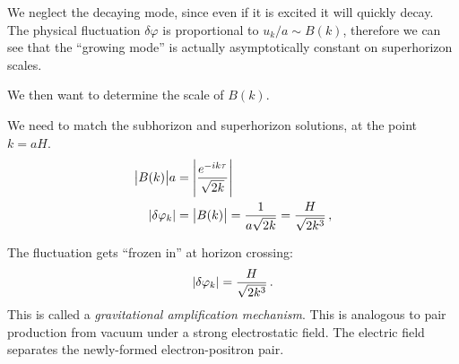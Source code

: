 \documentclass[main.tex]{subfiles}
\begin{document}
We neglect the decaying mode, since even if it is excited it will quickly decay.
The physical fluctuation \(\delta \varphi \) is proportional to \(u_k /a \sim B(k)\), therefore we can see that the ``growing mode'' is actually asymptotically constant on superhorizon scales. 

We then want to determine the scale of \(B(k)\). 

We need to match the subhorizon and superhorizon solutions, at the point \(k = aH\). 
%
\begin{align}
\abs{B(k)} a &= \abs{\frac{e^{-ik \tau }}{\sqrt{2 k}}}   \\
\abs{ \delta \varphi _k} &= \abs{B(k)} = \frac{1}{a \sqrt{2k}} 
= \frac{H}{\sqrt{2 k^3}}
\,,
\end{align}
%

The fluctuation gets ``frozen in'' at horizon crossing: 
%
\begin{align}
\abs{ \delta \varphi _k} = \frac{H}{\sqrt{2 k^3}}
\,.
\end{align}
%
This is called a \emph{gravitational amplification mechanism}.
This is analogous to pair production from vacuum under a strong electrostatic field. The electric field separates the newly-formed electron-positron pair. 
\end{document}
